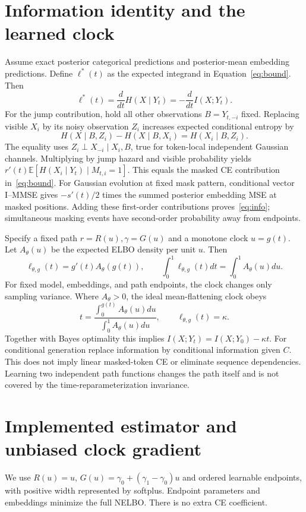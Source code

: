 \documentclass[11pt]{article}
\newcommand{\E}{\mathbb E}
\begin{document}
\section{Information identity and the learned clock}
Assume exact posterior categorical predictions and posterior-mean embedding
predictions. Define $\ell^*(t)$ as the expected integrand in
Equation~\eqref{eq:bound}. Then
\begin{equation}\label{eq:info}
 \ell^*(t)=\frac{d}{dt}H(X\mid Y_t)=-\frac{d}{dt}I(X;Y_t).
\end{equation}
For the jump contribution, hold all other observations $B=Y_{t,-i}$ fixed.
Replacing visible $X_i$ by its noisy observation $Z_i$ increases expected
conditional entropy by
\[
 H(X\mid B,Z_i)-H(X\mid B,X_i)=H(X_i\mid B,Z_i).
\]
The equality uses $Z_i\perp X_{-i}\mid X_i,B$, true for token-local
independent Gaussian channels. Multiplying by jump hazard and visible
probability yields $r'(t)\E[H(X_i\mid Y_t)\mid M_{t,i}=1]$.
This equals the masked CE contribution in~\eqref{eq:bound}.
For Gaussian evolution at fixed mask pattern, conditional vector I--MMSE
gives $-s'(t)/2$ times the summed posterior embedding MSE at masked positions.
Adding these first-order contributions proves~\eqref{eq:info}; simultaneous
masking events have second-order probability away from endpoints.

Specify a fixed path $r=R(u),\gamma=G(u)$ and a monotone clock $u=g(t)$.
Let $A_\theta(u)$ be the expected ELBO density per unit $u$. Then
\[
 \ell_{\theta,g}(t)=g'(t)A_\theta(g(t)),\qquad
 \int_0^1\ell_{\theta,g}(t)dt=\int_0^1A_\theta(u)du.
\]
For fixed model, embeddings, and path endpoints, the clock changes only
sampling variance. Where $A_\theta>0$, the ideal mean-flattening clock obeys
\[
 t=\frac{\int_0^{g(t)}A_\theta(u)du}{\int_0^1A_\theta(u)du},
 \qquad \ell_{\theta,g}(t)=\kappa.
\]
Together with Bayes optimality this implies
$I(X;Y_t)=I(X;Y_0)-\kappa t$. For conditional generation replace information
by conditional information given $C$. This does not imply linear
masked-token CE or eliminate sequence dependencies.
Learning two independent path functions changes the path itself and is not
covered by the time-reparameterization invariance.

\section{Implemented estimator and unbiased clock gradient}
We use $R(u)=u$, $G(u)=\gamma_0+(\gamma_1-\gamma_0)u$ and ordered learnable
endpoints, with positive width represented by softplus. Endpoint parameters
and embeddings minimize the full NELBO. There is no extra CE coefficient.
\end{document}
